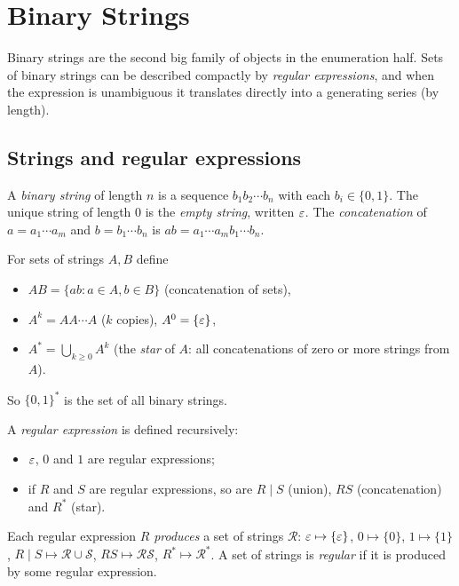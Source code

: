 \chapter{Binary Strings}

Binary strings are the second big family of objects in the enumeration half. Sets of binary
strings can be described compactly by \emph{regular expressions}, and when the expression is
unambiguous it translates directly into a generating series (by length).

\section{Strings and regular expressions}

\begin{definition}
A \emph{binary string} of length $n$ is a sequence $b_1b_2\cdots b_n$ with each $b_i \in\{0,1\}$.
The unique string of length $0$ is the \emph{empty string}, written $\varepsilon$. The
\emph{concatenation} of $a = a_1\cdots a_m$ and $b = b_1\cdots b_n$ is
$ab = a_1\cdots a_m b_1\cdots b_n$.
\end{definition}

For sets of strings $A, B$ define
\begin{itemize}
  \item $AB = \{ab : a \in A, b \in B\}$ (concatenation of sets),
  \item $A^k = AA\cdots A$ ($k$ copies), $A^0 = \{\varepsilon\}$,
  \item $A^* = \bigcup_{k\ge0} A^k$ (the \emph{star} of $A$: all concatenations of zero or more
        strings from $A$).
\end{itemize}
So $\{0,1\}^*$ is the set of all binary strings.

\begin{definition}
A \emph{regular expression} is defined recursively:
\begin{itemize}
  \item $\varepsilon$, $0$ and $1$ are regular expressions;
  \item if $R$ and $S$ are regular expressions, so are $R \mid S$ (union), $RS$ (concatenation)
        and $R^*$ (star).
\end{itemize}
Each regular expression $R$ \emph{produces} a set of strings $\mathcal{R}$:
$\varepsilon \mapsto \{\varepsilon\}$, $0 \mapsto \{0\}$, $1\mapsto\{1\}$,
$R\mid S \mapsto \mathcal{R}\cup\mathcal{S}$, $RS \mapsto \mathcal{R}\mathcal{S}$,
$R^* \mapsto \mathcal{R}^*$. A set of strings is \emph{regular} if it is produced by some
regular expression.
\end{definition}

